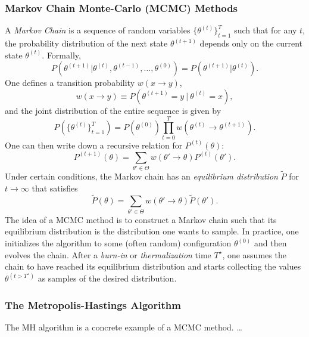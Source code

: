 \documentclass{article}
\begin{document}
\subsubsection*{Markov Chain Monte-Carlo (MCMC) Methods}
A \emph{Markov Chain} is a sequence of random variables $\{\theta^{(t)}\}_{t=1}^T$ such that for any $t$, the probability distribution of the next state $\theta^{(t+1)}$ depends only on the current state $\theta^{(t)}$. Formally,
\begin{equation}
    P(\theta^{(t+1)} | \theta^{(t)}, \theta^{(t-1)}, \dots,\theta^{(0)})
    =
    P(\theta^{(t+1)} | \theta^{(t)}).
\end{equation}
One defines a transition probability $w(x\rightarrow y)$,
\begin{equation}
    w(x\rightarrow y) \equiv P(\theta^{(t+1)} =y\ |\ \theta^{(t)}=x),
\end{equation}
and the joint distribution of the entire sequence is given by
\begin{equation}
    P\left(\{\theta^{(t)}\}_{t=1}^T\right)
    =
    P(\theta^{(0)}) \prod_{t=0}^{T}
    w(\theta^{(t)}\rightarrow \theta^{(t+1)}).
\end{equation}
One can then write down a recursive relation for $P^{(t)}(\theta)$:
\begin{equation}
    P^{(t+1)}(\theta)
    =
    \sum_{\theta' \in \Theta} w(\theta'\rightarrow \theta) P^{(t)}(\theta').
\end{equation}
Under certain conditions, the Markov chain has an \emph{equilibrium distribution} $\tilde{P}$ for $t\rightarrow\infty$ that satisfies
\begin{equation}
    \tilde{P}(\theta)
    =
    \sum_{\theta' \in \Theta} w(\theta'\rightarrow \theta) \tilde{P}(\theta').
\end{equation}
The idea of a MCMC method is to construct a Markov chain such that its equilibrium distribution is the distribution one wants to sample. In practice, one initializes the algorithm to some (often random) configuration $\theta^{(0)}$ and then evolves the chain. After a \emph{burn-in} or \emph{thermalization} time $T^{\star}$, one assumes the chain to have reached its equilibrium distribution and starts collecting the values $\theta^{(t>T^{\star})}$ as samples of the desired distribution.
\subsubsection*{The Metropolis-Hastings Algorithm}
The MH algorithm is a concrete example of a MCMC method. \dots
\end{document}
